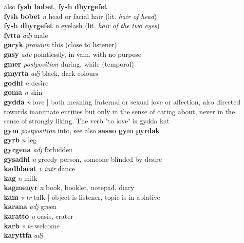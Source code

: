 also \textbf{fysh bobet}, \textbf{fysh dhyrgefet}\\\textbf{fysh bobet}   \emph{n} \textperiodcentered head or facial hair (lit. \emph{hair of head})\\\textbf{fysh dhyrgefet}   \emph{n} \textperiodcentered eyelash (lit. \emph{hair of the two eyes})\\\textbf{fytta}   \emph{adj} \textperiodcentered male\\\textbf{garyk}   \emph{pronoun} \textperiodcentered this (close to listener)\\\textbf{gasy}   \emph{adv} \textperiodcentered pointlessly, in vain, with no purpose\\\textbf{gmer}   \emph{postposition} \textperiodcentered during, while (temporal)\\\textbf{gmyrta}   \emph{adj} \textperiodcentered black, dark colours\\\textbf{godhl}   \emph{n} \textperiodcentered desire\\\textbf{goma}   \emph{n} \textperiodcentered skin\\\textbf{gydda}   \emph{n} \textperiodcentered love | both meaning fraternal or sexual love or affection, also directed towards inanimate entities but only in the sense of caring about, never in the sense of strongly liking. The verb "to love" is gydda kat\\\textbf{gym}   \emph{postposition} \textperiodcentered into, see also \textbf{sasao gym pyrdak}\\\textbf{gyrb}   \emph{n} \textperiodcentered leg\\\textbf{gyrgena}   \emph{adj} \textperiodcentered forbidden\\\textbf{gysadhl}   \emph{n} \textperiodcentered greedy person, someone blinded by desire\\\textbf{kadhlarat}   \emph{v intr} \textperiodcentered dance\\\textbf{kag}   \emph{n} \textperiodcentered milk\\\textbf{kagmenyr}   \emph{n} \textperiodcentered book, booklet, notepad, diary\\\textbf{kam}   \emph{v tr} \textperiodcentered talk | object is listener, topic is in ablative\\\textbf{karana}   \emph{adj} \textperiodcentered green\\\textbf{karatto}   \emph{n} \textperiodcentered oasis, crater\\\textbf{karb}   \emph{v tr} \textperiodcentered welcome\\\textbf{karyttfa}   \emph{adj} 